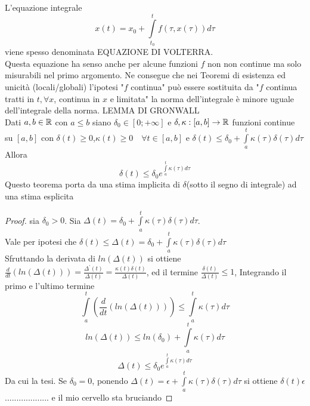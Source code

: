 \observation
L'equazione integrale 
$$x(t)=x_0+\int\limits_{t_0}^{t}f(\tau,x(\tau))d\tau$$
viene spesso denominata EQUAZIONE DI VOLTERRA.\\
Questa equazione ha senso anche per alcune funzioni $f$ non non continue ma solo misurabili nel primo argomento. Ne consegue che nei Teoremi di esistenza ed unicità (locali/globali) l'ipotesi "$f$ continua" può essere sostituita da "$f$ continua tratti in $t, \forall x$, continua in $x$ e limitata"
\observation
la norma dell'integrale è minore uguale dell'integrale della norma.
\proposition LEMMA DI GRONWALL\\
Dati $a,b\in \mathbb{R}$ con $a\le b$ siano $\delta_0\in \left[ 0;+\infty \right]$ e $\delta,\kappa:\left[a,b\right]\to \mathbb{R}$ funzioni continue su $\left[a,b\right]$ con $\delta(t)\ge 0$,$\kappa(t)\ge 0 \quad \forall t\in\left[ a,b\right] $ e $\delta(t)\le \delta_0+\int\limits_{a}^{t}\kappa(\tau)\delta(\tau)d\tau$Allora $$\delta(t)\le\delta_0e^{\int\limits_a^t\kappa(\tau)d\tau}$$
Questo teorema porta da una stima implicita di $\delta$(sotto il segno di integrale) ad una stima esplicita 
\begin{proof}
	sia $\delta_0 > 0$. Sia $\Delta(t)=\delta_0+\int\limits_a^t\kappa(\tau)\delta(\tau)d\tau$.\\
	Vale per ipotesi che $\delta(t)\le\Delta(t)=\delta_0+\int\limits_a^t\kappa(\tau)\delta(\tau)d\tau$\\
	Sfruttando la derivata di $ln(\Delta(t))$ si ottiene $\frac{d}{dt}(ln(\Delta(t)))= \frac{\Delta^{'}(t)}{\Delta(t)}=\frac{\kappa(t)\delta(t)}{\Delta(t)}$, ed il termine $\frac{\delta(t)}{\Delta(t)}\le 1$, Integrando il primo e l'ultimo termine
	$$\int\limits_a^t\left( \frac{d}{dt}\left(ln(\Delta(t))\right) \right)\le\int\limits_a^t\kappa(\tau)d\tau$$
	$$ln(\Delta(t))\le ln(\delta_0)+\int\limits_a^t\kappa(\tau)d\tau$$
	$$ \Delta(t)\le\delta_0e^{\int\limits_a^t\kappa(\tau)d\tau} $$
	Da cui la tesi.
	Se $\delta_0=0$, ponendo $\Delta(t)=\epsilon+\int\limits_a^t\kappa(\tau)\delta(\tau)d\tau$ si ottiene $\delta(t)\epsilon$ ................... e il mio cervello sta bruciando
\end{proof}

